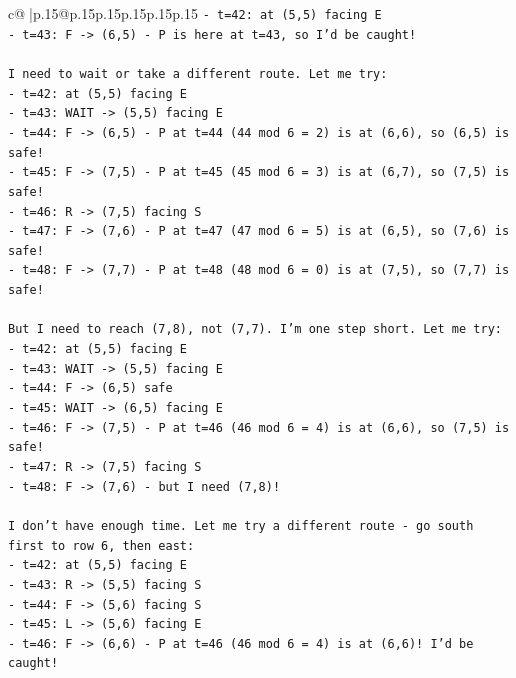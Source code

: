 \documentclass{article}
\begin{document}
{\begin{supertabular}{c@{$\;$}|p{.15\linewidth}@{}p{.15\linewidth}p{.15\linewidth}p{.15\linewidth}p{.15\linewidth}p{.15\linewidth}}
{{{\texttt{{-} t=42: at (5,5) facing E} \\
\texttt{{-} t=43: F {-}> (6,5) {-} P is here at t=43, so I'd be caught!} \\
\\ 
\texttt{I need to wait or take a different route. Let me try:} \\
\texttt{{-} t=42: at (5,5) facing E} \\
\texttt{{-} t=43: WAIT {-}> (5,5) facing E} \\
\texttt{{-} t=44: F {-}> (6,5) {-} P at t=44 (44 mod 6 = 2) is at (6,6), so (6,5) is safe!} \\
\texttt{{-} t=45: F {-}> (7,5) {-} P at t=45 (45 mod 6 = 3) is at (6,7), so (7,5) is safe!} \\
\texttt{{-} t=46: R {-}> (7,5) facing S} \\
\texttt{{-} t=47: F {-}> (7,6) {-} P at t=47 (47 mod 6 = 5) is at (6,5), so (7,6) is safe!} \\
\texttt{{-} t=48: F {-}> (7,7) {-} P at t=48 (48 mod 6 = 0) is at (7,5), so (7,7) is safe!} \\
\\ 
\texttt{But I need to reach (7,8), not (7,7). I'm one step short. Let me try:} \\
\texttt{{-} t=42: at (5,5) facing E} \\
\texttt{{-} t=43: WAIT {-}> (5,5) facing E} \\
\texttt{{-} t=44: F {-}> (6,5) safe} \\
\texttt{{-} t=45: WAIT {-}> (6,5) facing E} \\
\texttt{{-} t=46: F {-}> (7,5) {-} P at t=46 (46 mod 6 = 4) is at (6,6), so (7,5) is safe!} \\
\texttt{{-} t=47: R {-}> (7,5) facing S} \\
\texttt{{-} t=48: F {-}> (7,6) {-} but I need (7,8)!} \\
\\ 
\texttt{I don't have enough time. Let me try a different route {-} go south first to row 6, then east:} \\
\texttt{{-} t=42: at (5,5) facing E} \\
\texttt{{-} t=43: R {-}> (5,5) facing S} \\
\texttt{{-} t=44: F {-}> (5,6) facing S} \\
\texttt{{-} t=45: L {-}> (5,6) facing E} \\
\texttt{{-} t=46: F {-}> (6,6) {-} P at t=46 (46 mod 6 = 4) is at (6,6)! I'd be caught!} \\
}}}
\end{supertabular}}
\end{document}
